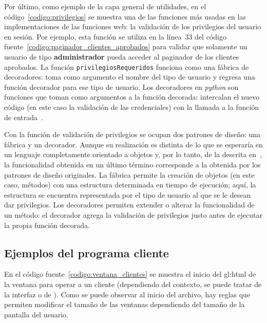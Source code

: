 Por último, como ejemplo de la capa general de utilidades, en el
código~\ref{codigo:privilegios} se muestra una de las funciones más usadas en
las implementaciones de las funciones web: la validación de los privilegios del
usuario en sesión. Por ejemplo, esta función se utiliza en la línea~33 del
código fuente~\ref{codigo:paginador_clientes_aprobados} para validar que
solamente un usuario de tipo \textbf{administrador} pueda acceder al paginador
de los clientes aprobados. La función \texttt{privilegiosRequeridos} funciona
como una fábrica de decoradores: toma como argumento el nombre del tipo de
usuario y regresa una función decorador para ese tipo de usuario. Los
decoradores en \textit{python} son funciones que toman como argumentos a la
función decorada: intercalan el nuevo código (en este caso la validación de las
credenciales) con la llamada a la función de entrada~\cite{python_decoradores}.

Con la función de validación de privilegios se ocupan dos patrones de diseño:
una fábrica y un decorador. Aunque su realización es distinta de lo que se
esperaría en un lenguaje completamente orientado a objetos y, por lo tanto, de
la descrita en~\cite{patrones_de_disenio}, la funcionalidad obtenida en un
último término corresponde a la obtenida por los patrones de diseño originales.
La fábrica permite la creación de objetos (en este caso, métodos) con una
estructura determinada en tiempo de ejecución; aquí, la estructura se encuentra
representada por el tipo de usuario al que se le desean dar privilegios. Los
decoradores permiten extender o alterar la funcionalidad de un método:
el decorador agrega la validación de privilegios justo antes de ejecutar
la propia función decorada.


\subsection{Ejemplos del programa cliente}

En el código fuente~\ref{codigo:ventana_clientes} se muestra el inicio del
\gls{gl:html} de la ventana para operar a un cliente (dependiendo del contexto,
se puede tratar de la interfaz  o de
). Como se puede observar al inicio del
archivo, hay reglas que permiten modificar el tamaño de las ventanas dependiendo
del tamaño de la pantalla del usuario.


